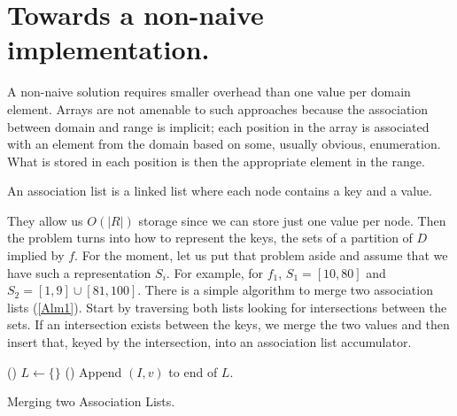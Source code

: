 \documentclass{article}
\begin{document}
\section{Towards a non-naive implementation.}

A non-naive solution requires smaller overhead than one value per domain element.
Arrays are not amenable to such approaches
because the association between domain and range is implicit;
each position in the array is associated with an element from the domain
based on some, usually obvious, enumeration.
What is stored in each position is then the appropriate element in the range.

\begin{comment}
We could store only the range elements in an array,
but that would just transfer the difficulty of the problem into
figuring out how to index into such an array.

\end{comment}

An association list is a linked list where each node contains a key and a value.
\begin{comment}
For our purposes, they highlight how to separate two concerns necessary for
our representation.
\end{comment}
They allow us $O(|R|)$ storage since we can store just one value per node.
Then the problem turns into how to represent the keys,
the sets of a partition of $D$ implied by $f$.
For the moment,
let us put that problem aside and assume that we have such a representation
$S_{i}$.
For example, for $f_{1}$, $S_{1} = [10,80]$ and $S_{2} = [1,9]\cup[81,100]$.
There is a simple algorithm to merge two association lists (\ref{Alm1}).
Start by traversing both lists looking for intersections between the sets.
If an intersection exists between the keys,
we merge the two values and then insert that,
keyed by the intersection,
into an association list accumulator.

\begin{algorithm}[H]
  \newcommand{\forcond}{$i=0$ \KwTo $n$}
  \DontPrintSemicolon
  \Fn(){}{
    $L \leftarrow \{\} $\;
  }
  \Fn(){}{
    Append $(I,v)$ to end of $L$.\;
  }
\caption{Merging two Association Lists.\label{Alm1}}
\end{algorithm}
\end{document}
